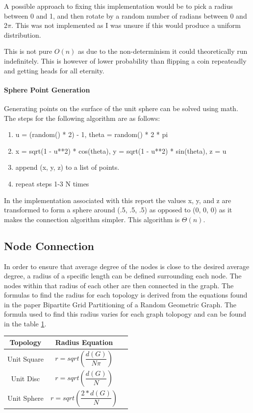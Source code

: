 \documentclass{article}
\begin{document}
    A possible approach to fixing this implementation would be to pick a radius between 0 and 1, and then rotate by a random number of radians between 0 and 2$\pi$.
    This was not implemented as I was unsure if this would produce a uniform distribution.

    This is not pure $O(n)$ as due to the non-determinism it could theoretically run indefinitely.
    This is however of lower probability than flipping a coin repeateadly and getting heads for all eternity.

  \paragraph{Sphere Point Generation}
    Generating points on the surface of the unit sphere can be solved using math.
    The steps for the following algorithm are as follows:

    \begin{enumerate}
      \item u = (random() * 2) - 1, theta = random() * 2 * pi
      \item x = sqrt(1 - u**2) * cos(theta), y = sqrt(1 - u**2) * sin(theta), z = u
      \item append (x, y, z) to a list of points.
      \item repeat steps 1-3 N times
    \end{enumerate}

    In the implementation associated with this report the values x, y, and z are transformed to form a sphere around (.5, .5, .5) as opposed to (0, 0, 0) as it makes the connection algorithm simpler.
    This algorithm is $\Theta(n)$.

	\subsection{Node Connection}
		In order to ensure that average degree of the nodes is close to the desired average degree, a radius of a specific length can be defined surrounding each node.
    The nodes within that radius of each other are then connected in the graph.
		The formulas to find the radius for each topology is derived from the equations found in the paper Bipartite Grid Partitioning of a Random Geometric Graph\cite{chen2017bipartite}.
		The formula used to find this radius varies for each graph tolopogy and can be found in the table \ref{radius_equations}.

    \begin{table}
      \centering
      \label{radius_equations}
  		\begin{tabular}{ |c|c|c| }
  				\hline
  				Topology &  Radius Equation \\
  				\hline
  				Unit Square & $r = sqrt(\dfrac{d(G)}{N\pi})$ \\
  				\hline
  				Unit Disc & $r = sqrt(\dfrac{d(G)}{N})$ \\
  				\hline
  				Unit Sphere & $r = sqrt(\dfrac{2*d(G)}{N})$ \\
  				\hline
  		\end{tabular}
    \end{table}
\end{document}
